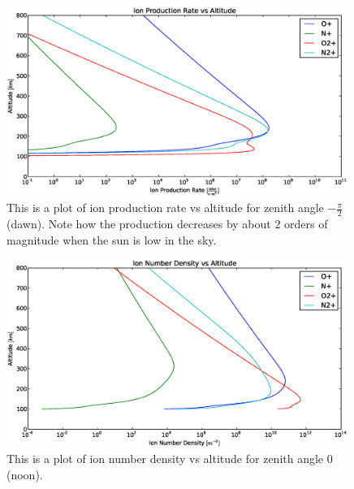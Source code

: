 \documentclass[10pt]{article}
\begin{document}
\begin{figure}[H]
	\centering
		\includegraphics[width=0.99\textwidth]{./dawn/B/Ion_Production_Rate_vs_Altitude_100_800.eps}
	\caption{This is a plot of ion production rate vs altitude for zenith angle $-\frac{\pi}{2}$ (dawn). Note how the production decreases by about 2 orders of magnitude when the sun is low in the sky.}
	\label{fig:production2}
\end{figure}
\begin{figure}[H]
	\centering
		\includegraphics[width=0.99\textwidth]{./noon/B/Ion_Number_Density_vs_Altitude_100_800.eps}
	\caption{This is a plot of ion number density vs altitude for zenith angle $0$ (noon). }
	\label{fig:n1}
\end{figure}
\end{document}

